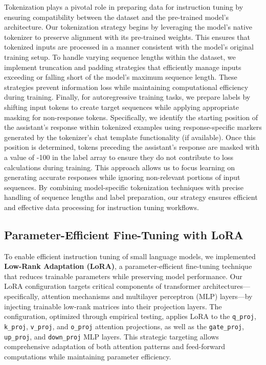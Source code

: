 \documentclass[11pt]{article}
\begin{document}
Tokenization plays a pivotal role in preparing data for instruction tuning by ensuring compatibility between the dataset and the pre-trained model's architecture. Our tokenization strategy begins by leveraging the model's native tokenizer to preserve alignment with its pre-trained weights. This ensures that tokenized inputs are processed in a manner consistent with the model's original training setup. To handle varying sequence lengths within the dataset, we implement truncation and padding strategies that efficiently manage inputs exceeding or falling short of the model's maximum sequence length. These strategies prevent information loss while maintaining computational efficiency during training.
Finally, for autoregressive training tasks, we prepare labels by shifting input tokens to create target sequences while applying appropriate masking for non-response tokens. Specifically, we identify the starting position of the assistant's response within tokenized examples using response-specific markers generated by the tokenizer's chat template functionality (if available). Once this position is determined, tokens preceding the assistant's response are masked with a value of -100 in the label array to ensure they do not contribute to loss calculations during training. This approach allows us to focus learning on generating accurate responses while ignoring non-relevant portions of input sequences. By combining model-specific tokenization techniques with precise handling of sequence lengths and label preparation, our strategy ensures efficient and effective data processing for instruction tuning workflows.
\subsection{Parameter-Efficient Fine-Tuning with LoRA}
To enable efficient instruction tuning of small language models, we implemented \textbf{Low-Rank Adaptation (LoRA)}, a parameter-efficient fine-tuning technique that reduces trainable parameters while preserving model performance. Our LoRA configuration targets critical components of transformer architectures—specifically, attention mechanisms and multilayer perceptron (MLP) layers—by injecting trainable low-rank matrices into their projection layers. The configuration, optimized through empirical testing, applies LoRA to the \texttt{q\_proj}, \texttt{k\_proj}, \texttt{v\_proj}, and \texttt{o\_proj} attention projections, as well as the \texttt{gate\_proj}, \texttt{up\_proj}, and \texttt{down\_proj} MLP layers. This strategic targeting allows comprehensive adaptation of both attention patterns and feed-forward computations while maintaining parameter efficiency.
\end{document}
